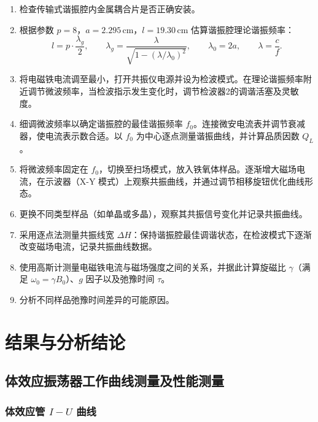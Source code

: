 \documentclass[a4paper, 1.5lines]{ctexart}
\begin{document}
\begin{enumerate}

\item 检查传输式谐振腔内金属耦合片是否正确安装。

\item 根据参数 $p=8$，$a=2.295\,\text{cm}$，$l=19.30\,\text{cm}$ 估算谐振腔理论谐振频率：
\[
l=p\cdot\frac{\lambda_g}{2}, \qquad
\lambda_g=\frac{\lambda}{\sqrt{1-(\lambda/\lambda_0)^2}}, \qquad
\lambda_0=2a, \qquad
\lambda=\frac{c}{f}.
\]

\item 将电磁铁电流调至最小，打开共振仪电源并设为检波模式。在理论谐振频率附近调节微波频率，当检波指示发生变化时，调节检波器2的调谐活塞及灵敏度。

\item 细调微波频率以确定谐振腔的最佳谐振频率 $f_0$。连接微安电流表并调节衰减器，使电流表示数合适。以 $f_0$ 为中心逐点测量谐振曲线，并计算品质因数 $Q_L$。

\item 将微波频率固定在 $f_0$，切换至扫场模式，放入铁氧体样品。逐渐增大磁场电流，在示波器（X-Y 模式）上观察共振曲线，并通过调节相移旋钮优化曲线形态。

\item 更换不同类型样品（如单晶或多晶），观察其共振信号变化并记录共振曲线。

\item 采用逐点法测量共振线宽 $\Delta H$：保持谐振腔最佳调谐状态，在检波模式下逐渐改变磁场电流，记录共振曲线数据。

\item 使用高斯计测量电磁铁电流与磁场强度之间的关系，并据此计算旋磁比 $\gamma$（满足 $\omega_0=\gamma B_0$）、$g$ 因子以及弛豫时间 $\tau$。

\item 分析不同样品弛豫时间差异的可能原因。

\end{enumerate}

    \section{结果与分析结论}

    \subsection{体效应振荡器工作曲线测量及性能测量}

\subsubsection{体效应管 $I-U$ 曲线}
\end{document}
